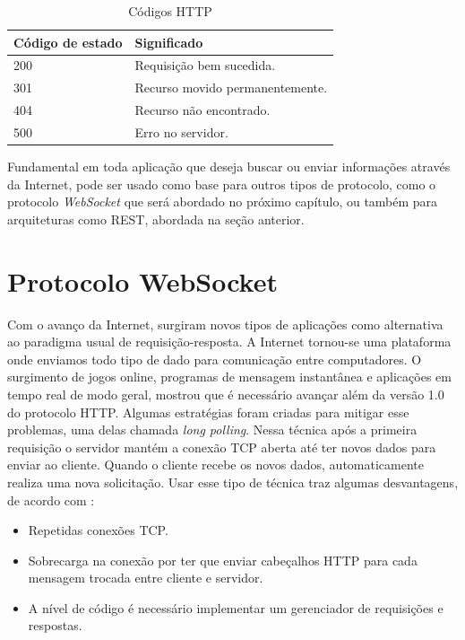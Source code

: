 \begin{table}[ht!]
	\centering
	\begin{tabular}{@{}ll@{}}
		\toprule
		\textbf{Código de estado}	     & \textbf{Significado}       \\ \midrule
		200		             & Requisição bem sucedida.       \\
		301				     & Recurso movido permanentemente.         \\
		404          	  	 & Recurso não encontrado.                      \\
		500				     & Erro no servidor.         \\
        \bottomrule
	\end{tabular}
	\caption{Códigos HTTP}
    \label{table:codigos-http}
\end{table}


Fundamental em toda aplicação que deseja buscar ou enviar informações através da Internet, pode ser usado como base para outros tipos de protocolo, como o protocolo \textit{WebSocket} que será abordado no próximo capítulo, ou também para arquiteturas como REST, abordada na seção anterior. 

\section{Protocolo WebSocket}

Com o avanço da Internet, surgiram novos tipos de aplicações como alternativa ao paradigma usual de requisição-resposta.
A Internet tornou-se uma plataforma onde enviamos todo tipo de dado para comunicação entre computadores. O surgimento de jogos online, programas de mensagem instantânea e aplicações em tempo real de modo geral, mostrou que é necessário avançar além da versão 1.0 do protocolo HTTP.
Algumas estratégias foram criadas para mitigar esse problemas, uma delas chamada \textit{long polling}. Nessa técnica após a primeira requisição o servidor mantém a conexão TCP aberta até ter novos dados para enviar ao cliente. Quando o cliente recebe os novos dados, automaticamente realiza uma nova solicitação.
Usar esse tipo de técnica traz algumas desvantagens, de acordo com \cite[Sec.~1]{websocketprotocol2011}:

\begin{itemize}
	\item Repetidas conexões TCP.
    \item Sobrecarga na conexão por ter que enviar cabeçalhos HTTP para cada mensagem trocada entre cliente e servidor.
    \item A nível de código é necessário implementar um gerenciador de requisições e respostas.
\end{itemize}

